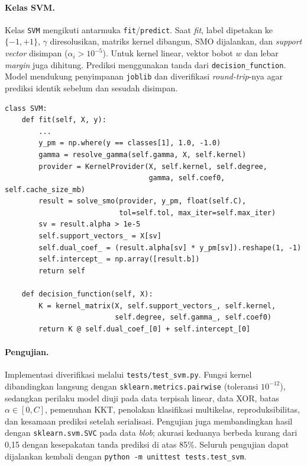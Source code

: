 \paragraph{Kelas SVM.}
Kelas \texttt{SVM} mengikuti antarmuka \texttt{fit}/\texttt{predict}. Saat
\textit{fit}, label dipetakan ke $\{-1,+1\}$, $\gamma$ diresolusikan, matriks
kernel dibangun, SMO dijalankan, dan \textit{support vector} disimpan
($\alpha_i > 10^{-5}$). Untuk kernel linear, vektor bobot $w$ dan lebar
\textit{margin} juga dihitung. Prediksi menggunakan tanda dari
\texttt{decision\_function}. Model mendukung penyimpanan \texttt{joblib} dan
diverifikasi \textit{round-trip}-nya agar prediksi identik sebelum dan sesudah
disimpan.
\begin{lstlisting}
class SVM:
    def fit(self, X, y):
        ...
        y_pm = np.where(y == classes[1], 1.0, -1.0)
        gamma = resolve_gamma(self.gamma, X, self.kernel)
        provider = KernelProvider(X, self.kernel, self.degree,
                                  gamma, self.coef0, self.cache_size_mb)
        result = solve_smo(provider, y_pm, float(self.C),
                           tol=self.tol, max_iter=self.max_iter)
        sv = result.alpha > 1e-5
        self.support_vectors_ = X[sv]
        self.dual_coef_ = (result.alpha[sv] * y_pm[sv]).reshape(1, -1)
        self.intercept_ = np.array([result.b])
        return self

    def decision_function(self, X):
        K = kernel_matrix(X, self.support_vectors_, self.kernel,
                          self.degree, self.gamma_, self.coef0)
        return K @ self.dual_coef_[0] + self.intercept_[0]
\end{lstlisting}

\paragraph{Pengujian.}
Implementasi diverifikasi melalui \texttt{tests/test\_svm.py}. Fungsi kernel
dibandingkan langsung dengan \texttt{sklearn.metrics.pairwise} (toleransi
$10^{-12}$), sedangkan perilaku model diuji pada data terpisah linear, data XOR,
batas $\alpha \in [0,C]$, pemenuhan KKT, penolakan klasifikasi multikelas,
reproduksibilitas, dan kesamaan prediksi setelah serialisasi. Pengujian juga
membandingkan hasil dengan \texttt{sklearn.svm.SVC} pada data \textit{blob};
akurasi keduanya berbeda kurang dari 0,15 dengan kesepakatan tanda prediksi
di atas 85\%. Seluruh pengujian dapat dijalankan kembali dengan
\texttt{python -m unittest tests.test\_svm}.

